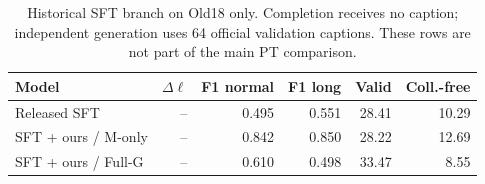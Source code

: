 \begin{table}[ht]\centering\small
\caption{Historical SFT branch on Old18 only. Completion receives no caption; independent generation uses 64 official validation captions. These rows are not part of the main PT comparison.}
\label{tab:sft}
\begin{tabular}{@{}lrrrrr@{}}\toprule
Model & $\Delta\ell$ & F1 normal & F1 long & Valid & Coll.-free \\ \midrule
Released SFT & -- & 0.495 & 0.551 & 28.41 & 10.29 \\
SFT + ours / M-only & -- & 0.842 & 0.850 & 28.22 & 12.69 \\
SFT + ours / Full-G & -- & 0.610 & 0.498 & 33.47 & 8.55 \\
\bottomrule\end{tabular}\end{table}
